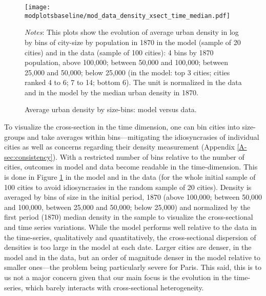 \documentclass[11pt]{report}
\newcommand{\round}{revision3}  %
\newcommand{\modplotsbaseline}{../../output/model/plots/\round/baseline}
\newcommand{\modplots}{../../output/model/plots/\round}
\newcommand{\ptwo}{0.5}  %
\begin{document}
\begin{figure}[h!]
		\texttt{[image: \\modplotsbaseline/mod\_data\_density\_xsect\_time\_median.pdf]}
	\caption{Average urban density by size-bins: model versus data.\label{fig:density-sizebin}}
	{\footnotesize \textit{Notes}: This plots show the evolution of average urban density in log by bins of city-size by population in 1870 in the model (sample of 20 cities) and in the data (sample of 100 cities): 4 bins by 1870 population, above 100,000; between 50,000 and 100,000; between 25,000 and 50,000; below 25,000 (in the model: top 3 cities; cities ranked 4 to 6; 7 to 14; bottom 6). The unit is normalized in the data and in the model by the median urban density in 1870.}
\end{figure} 

To visualize the cross-section in the time dimension, one can bin cities into size-groups and take averages within bins---mitigating the idiosyncrasies of individual cities as well as concerns regarding their density measurement (Appendix \ref{A-sec:consistency}). With a restricted number of bins relative to the number of cities, outcomes in model and data become readable in the time-dimension. This is done in Figure \ref{fig:density-sizebin} in the model and in the data (for the whole initial sample of 100 cities to avoid idiosyncrasies in the random sample of 20 cities). Density is averaged by bins of size in the initial period, 1870 (above 100,000; between 50,000 and 100,000, between 25,000 and 50,000; below 25,000) and normalized by the first period (1870) median density in the sample to visualize the cross-sectional and time series variations. While the model performs well relative to the data in the time-series, qualitatively and quantitatively, the cross-sectional dispersion of densities is too large in the model at each date. Larger cities are denser, in the model and in the data, but an order of magnitude denser in the model relative to smaller ones---the problem being particularly severe for Paris. This said, this is to us not a major concern given that our main focus is the evolution in the time-series, which barely interacts with cross-sectional heterogeneity.
\end{document}
